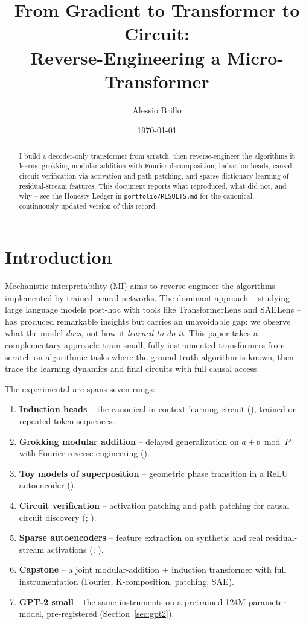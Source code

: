 \documentclass[11pt]{article}
\title{From Gradient to Transformer to Circuit: \\
  \large Reverse-Engineering a Micro-Transformer}
\author{Alessio Brillo}
\date{\today}
\begin{document}
\maketitle

\begin{abstract}
I build a decoder-only transformer from scratch, then reverse-engineer the
algorithms it learns: grokking modular addition with Fourier decomposition,
induction heads, causal circuit verification via activation and path
patching, and sparse dictionary learning of residual-stream features. This
document reports what reproduced, what did not, and why -- see the Honesty
Ledger in \texttt{portfolio/RESULTS.md} for the canonical, continuously
updated version of this record.
\end{abstract}

\tableofcontents

\section{Introduction}
\label{sec:intro}

Mechanistic interpretability (MI) aims to reverse-engineer the algorithms
implemented by trained neural networks. The dominant approach -- studying
large language models post-hoc with tools like TransformerLens and
SAELens -- has produced remarkable insights but carries an unavoidable
gap: we observe what the model \emph{does}, not how it \emph{learned to do
it}. This paper takes a complementary approach: train small, fully
instrumented transformers from scratch on algorithmic tasks where the
ground-truth algorithm is known, then trace the learning dynamics and
final circuits with full causal access.

The experimental arc spans seven rungs:
\begin{enumerate}
  \item \textbf{Induction heads} -- the canonical in-context learning
    circuit (\citep{olsson2022induction}), trained on repeated-token sequences.
  \item \textbf{Grokking modular addition} -- delayed generalization on
    $a+b \bmod P$ with Fourier reverse-engineering (\citep{nanda2023progress}).
  \item \textbf{Toy models of superposition} -- geometric phase transition
    in a ReLU autoencoder (\citep{elhage2022superposition}).
  \item \textbf{Circuit verification} -- activation patching and path
    patching for causal circuit discovery (\citep{wang2023interpretability};
    \citep{zhang2024best}).
  \item \textbf{Sparse autoencoders} -- feature extraction on synthetic and
    real residual-stream activations (\citep{bricken2023monosemanticity};
    \citep{cunningham2024sparse}).
  \item \textbf{Capstone} -- a joint modular-addition + induction
    transformer with full instrumentation (Fourier, K-composition,
    patching, SAE).
  \item \textbf{GPT-2 small} -- the same instruments on a pretrained
    124M-parameter model, pre-registered (Section~\ref{sec:gpt2}).
\end{enumerate}
\end{document}
